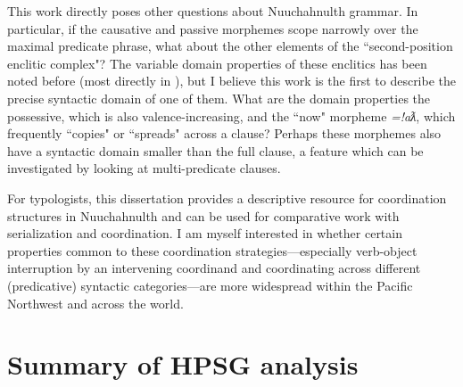 This work directly poses other questions about Nuuchahnulth grammar. In particular, if the causative and passive morphemes scope narrowly over the maximal predicate phrase, what about the other elements of the ``second-position enclitic complex"? The variable domain properties of these enclitics has been noted before (most directly in \citealt[p.~106--109,253--255]{davidson2002}), but I believe this work is the first to describe the precise syntactic domain of one of them. What are the domain properties the possessive, which is also valence-increasing, and the ``now" morpheme \textit{=!aƛ}, which frequently ``copies" or ``spreads" across a clause? Perhaps these morphemes also have a syntactic domain smaller than the full clause, a feature which can be investigated by looking at multi-predicate clauses. %


For typologists, this dissertation provides a descriptive resource for coordination structures in Nuuchahnulth and can be used for comparative work with serialization and coordination. I am myself interested in whether certain properties common to these coordination strategies---especially verb-object interruption by an intervening coordinand and coordinating across different (predicative) syntactic categories---are more widespread within the Pacific Northwest and across the world.

\section{Summary of HPSG analysis}

